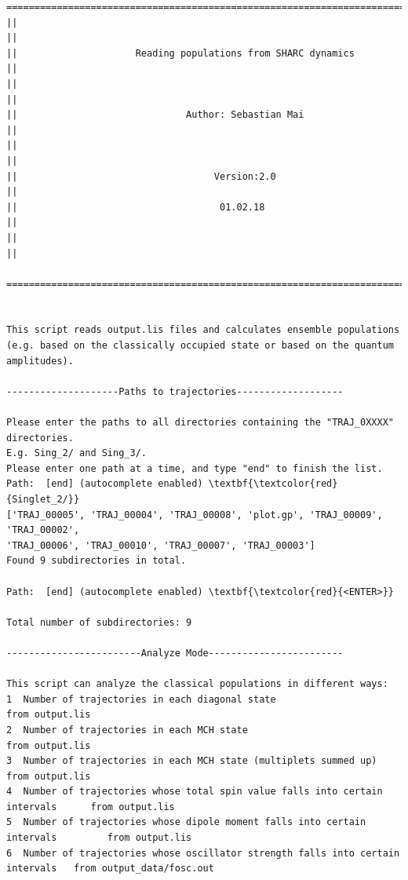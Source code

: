 \documentclass[a4paper,11pt,DIV=15,openany]{scrbook}
\begin{document}
\begin{oframed}
\footnotesize\begin{Verbatim}[commandchars=\\\{\}]
  ================================================================================
||                                                                                ||
||                     Reading populations from SHARC dynamics                    ||
||                                                                                ||
||                              Author: Sebastian Mai                             ||
||                                                                                ||
||                                   Version:2.0                                  ||
||                                    01.02.18                                    ||
||                                                                                ||
  ================================================================================


This script reads output.lis files and calculates ensemble populations 
(e.g. based on the classically occupied state or based on the quantum amplitudes).
  
--------------------Paths to trajectories-------------------

Please enter the paths to all directories containing the "TRAJ_0XXXX" directories.
E.g. Sing_2/ and Sing_3/. 
Please enter one path at a time, and type "end" to finish the list.
Path:  [end] (autocomplete enabled) \textbf{\textcolor{red}{Singlet_2/}}
['TRAJ_00005', 'TRAJ_00004', 'TRAJ_00008', 'plot.gp', 'TRAJ_00009', 'TRAJ_00002', 
'TRAJ_00006', 'TRAJ_00010', 'TRAJ_00007', 'TRAJ_00003']
Found 9 subdirectories in total.

Path:  [end] (autocomplete enabled) \textbf{\textcolor{red}{<ENTER>}}

Total number of subdirectories: 9

------------------------Analyze Mode------------------------

This script can analyze the classical populations in different ways:
1  Number of trajectories in each diagonal state                                   from output.lis
2  Number of trajectories in each MCH state                                        from output.lis
3  Number of trajectories in each MCH state (multiplets summed up)                 from output.lis
4  Number of trajectories whose total spin value falls into certain intervals      from output.lis
5  Number of trajectories whose dipole moment falls into certain intervals         from output.lis
6  Number of trajectories whose oscillator strength falls into certain intervals   from output_data/fosc.out


\end{Verbatim}
\end{oframed}
\end{document}
